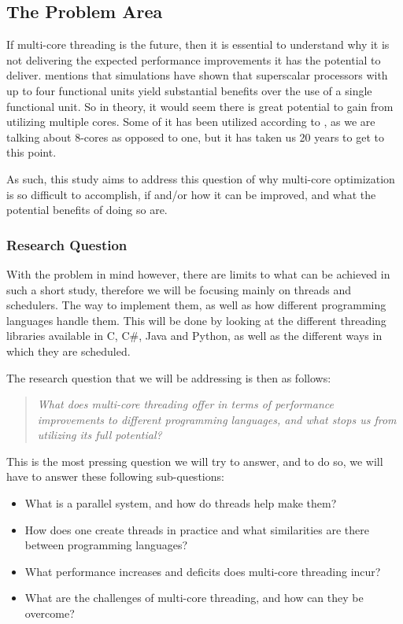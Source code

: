 \documentclass[12pt,a4paper]{article}
\begin{document}
\subsection{The Problem Area}

If multi-core threading is the future, then it is essential to understand why it is not delivering the expected performance improvements it has the potential to deliver. \cite[p. 12]{Rauber2023} mentions that simulations have shown that superscalar processors with up to four functional units yield substantial benefits over the use of a single functional unit. So in theory, it would seem there is great potential to gain from utilizing multiple cores. Some of it has been utilized according to \textcite{Thomas2025}, as we are talking about 8-cores as opposed to one, but it has taken us 20 years to get to this point.

As such, this study aims to address this question of why multi-core optimization is so difficult to accomplish, if and/or how it can be improved, and what the potential benefits of doing so are. 

\subsubsection{Research Question}

With the problem in mind however, there are limits to what can be achieved in such a short study, therefore we will be focusing mainly on threads and schedulers. The way to implement them, as well as how different programming languages handle them. This will be done by looking at the different threading libraries available in C, C\#, Java and Python, as well as the different ways in which they are scheduled.

The research question that we will be addressing is then as follows:

\begin{quote}
    \textit{What does multi-core threading offer in terms of performance improvements to different programming languages, and what stops us from utilizing its full potential?}
\end{quote}

This is the most pressing question we will try to answer, and to do so, we will have to answer these following sub-questions:

\begin{itemize}
    \item What is a parallel system, and how do threads help make them?
    \item How does one create threads in practice and what similarities are there between programming languages?
    \item What performance increases and deficits does multi-core threading incur?
    \item What are the challenges of multi-core threading, and how can they be overcome?
\end{itemize}
\end{document}
